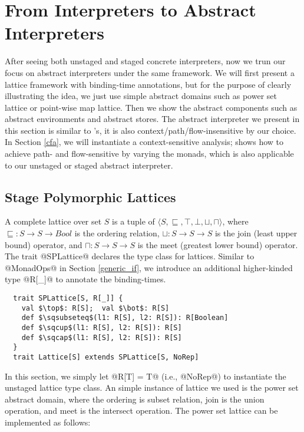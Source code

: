 \section{From Interpreters to Abstract Interpreters} \label{unstaged_abs}

After seeing both unstaged and staged concrete interpreters, now we trun our
focus on abstract interpreters under the same framework. We will first present a
lattice framework with binding-time annotations, but for the purpose of clearly
illustrating the idea, we just use simple abstract domains such as power set
lattice or point-wise map lattice. Then we show the abstract components such as
abstract environments and abstract stores.
The abstract interpreter we present in this section is similar to
\citet{DBLP:journals/pacmpl/DaraisLNH17}'s, it is also
context/path/flow-insensitive by our choice.  In Section \ref{cfa}, we will
instantiate a context-sensitive analysis;
\citet{Darais:2015:GTM:2814270.2814308} shows how to achieve path- and
flow-sensitive by varying the monads, which is also applicable to our unstaged or
staged abstract interpreter. 

\subsection{Stage Polymorphic Lattices} \label{stagedpoly_lat}

A complete lattice over set $S$ is a tuple of $\langle S, \sqsubseteq, \top,
\bot, \sqcup, \sqcap \rangle$, where $\sqsubseteq : S \to S \to Bool$ is the
ordering relation, $\sqcup: S \to S \to S$ is the join (least upper bound)
operator, and $\sqcap: S \to S \to S$ is the meet (greatest lower bound)
operator. The trait @SPLattice@ declares the type class for lattices.
Similar to @MonadOps@ in Section \ref{generic_if}, we introduce an additional
higher-kinded type @R[_]@ to annotate the binding-times.

\begin{lstlisting}
  trait SPLattice[S, R[_]] {
    val $\top$: R[S];  val $\bot$: R[S]
    def $\sqsubseteq$(l1: R[S], l2: R[S]): R[Boolean]
    def $\sqcup$(l1: R[S], l2: R[S]): R[S]
    def $\sqcap$(l1: R[S], l2: R[S]): R[S]
  }
  trait Lattice[S] extends SPLattice[S, NoRep]
\end{lstlisting}

In this section, we simply let @R[T] = T@ (i.e., @NoRep@) to instantiate the
unstaged lattice type class. An simple instance of lattice we used is the power
set abstract domain, where the ordering is subset relation, join is the union
operation, and meet is the intersect operation. The power set lattice can be
implemented as follows:

